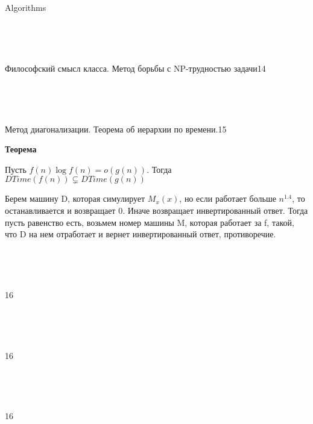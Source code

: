 \documentclass{article}
\begin{document}
\begin{center}

\Huge Algorithms

\end{center}

~\

~\


\begin{question}{Философский смысл класса. Метод борьбы с NP-трудностью задачи}{14}

\end{question}

~\

~\

\begin{question}{Метод диагонализации. Теорема об иерархии по времени.}{15}

\textbf{Теорема}

Пусть $f(n) \log{f(n)} = o(g(n))$. Тогда $DTime(f(n)) \subsetneq DTime(g(n))$

Берем машину D, которая симулирует $M_x(x)$, но если работает больше $n^{1.4}$, то останавливается и возвращает 0. Иначе возвращает инвертированный ответ. Тогда пусть равенство есть, возьмем номер машины M, которая работает за f, такой, что D на нем отработает и вернет инвертированный ответ, противоречие.


\end{question}

~\

~\

\begin{question}{}{16}

\end{question}

~\

~\

\begin{question}{}{16}

\end{question}

~\

~\

\begin{question}{}{16}

\end{question}

~\

~\
\end{document}
